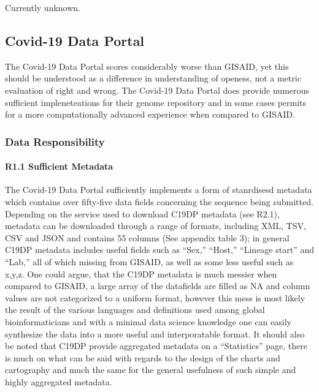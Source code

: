 \documentclass{article}
\begin{document}
Currently unknown.

\hypertarget{covid-19-data-portal}{%
\subsection{Covid-19 Data Portal}\label{covid-19-data-portal}}

The Covid-19 Data Portal scores considerably worse than GISAID, yet this
should be understood as a difference in understanding of openess, not a
metric evaluation of right and wrong. The Covid-19 Data Portal does
provide numerous sufficient impleneteations for their genome repository
and in some cases permits for a more computationally advanced experience
when compared to GISAID.

\hypertarget{data-responsibility-2}{%
\subsubsection{Data Responsibility}\label{data-responsibility-2}}

\hypertarget{r1.1-sufficient-metadata-1}{%
\paragraph{R1.1 Sufficient Metadata}\label{r1.1-sufficient-metadata-1}}

The Covid-19 Data Portal sufficiently implements a form of stanrdisesd
metadata which contains over fifty-five data fields concerning the
sequence being submitted. Depending on the service used to download
C19DP metadata (see R2.1), metadata can be downloaded through a range of
formats, including XML, TSV, CSV and JSON and contains 55 columns (See
appendix table 3); in general C19DP metadata includes useful fields such
as ``Sex,'' ``Host,'' ``Lineage start'' and ``Lab,'' all of which
missing from GISAID, as well as some less useful such as x,y,z. One
could argue, that the C19DP metadata is much messier when compared to
GISAID, a large array of the datafields are filled as NA and column
values are not categorized to a uniform format, however this mess is
most likely the result of the various languages and definitions used
among global bioinformaticians and with a minimal data science knowledge
one can easily synthesize the data into a more useful and interporatable
format. It should also be noted that C19DP provide aggregated metadata
on a ``Statistics'' page, there is much on what can be said with regards
to the design of the charts and cartography and much the same for the
general usefulness of such simple and highly aggregated metadata.
\end{document}

